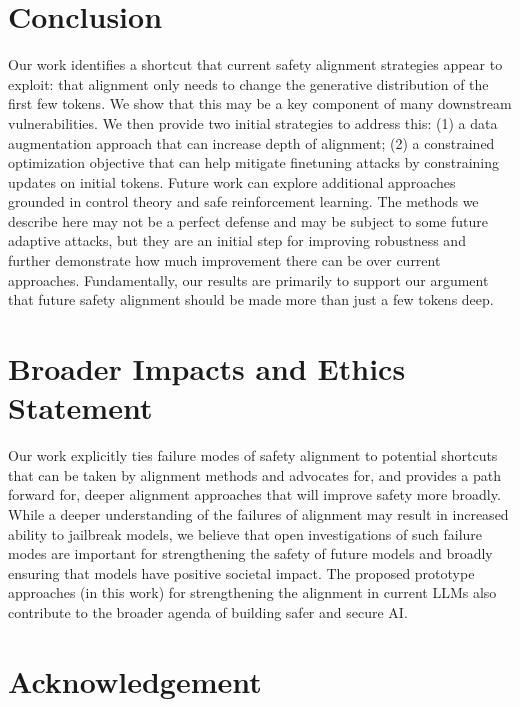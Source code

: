 \section{Conclusion}
\label{sec:conclusion}

Our work identifies a shortcut that current safety alignment strategies appear to exploit: that alignment only needs to change the generative distribution of the first few tokens. We show that this may be a key component of many downstream vulnerabilities. We then provide two initial strategies to address this: (1) a data augmentation approach that can increase depth of alignment; (2) a constrained optimization objective that can help mitigate finetuning attacks by constraining updates on initial tokens. Future work can explore additional approaches grounded in control theory and safe reinforcement learning. 
The methods we describe here may not be a perfect defense and may be subject to some future adaptive attacks, but they are an initial step for improving robustness and further demonstrate how much improvement there can be over current approaches. Fundamentally, our results are primarily to support our argument that future safety alignment should be made more than just a few tokens deep.


\section*{Broader Impacts and Ethics Statement}

Our work explicitly ties failure modes of safety alignment to potential shortcuts that can be taken by alignment methods and advocates for, and provides a path forward for, deeper alignment approaches that will improve safety more broadly. While a deeper understanding of the failures of alignment may result in increased ability to jailbreak models, we believe that open investigations of such failure modes are important for strengthening the safety of future models and broadly ensuring that models have positive societal impact. The proposed prototype approaches (in this work) for strengthening the alignment in current LLMs also contribute to the broader agenda of building safer and secure AI.

\section*{Acknowledgement}



